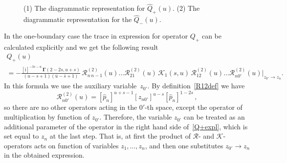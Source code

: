 \documentclass[a4paper,11pt]{article}
\renewcommand{\imath}{\mathrm{i}}
\numberwithin{equation}{section}
\begin{document}
\begin{figure}[H]
		\caption{
			(1) The diagrammatic representation for
			$\hat{Q}_+(u)$.
			(2) The diagrammatic representation for the 
			$\hat{Q}_-(u)$.}
		\label{q+-}	
	\end{figure}

In the one-boundary case the trace in expression for operator $Q_+$ can be calculated explicitly and we get the following result
\begin{multline} \label{Q+expl}
	Q_+(u) \\
	= -\frac{[\imath]^{-3s-u}\,\mathbf{\Gamma}(2-2s,u+s)}{(u-s+1)(\bar{u}-\bar{s}+1)} \,
	\mathcal{R}^{(2)}_{n\,n-1}(u)\ldots\mathcal{R}^{(2)}_{21}(u)\,\mathcal{K}_1(s,u)\,\mathcal{R}^{(2)}_{12}(u)\ldots\mathcal{R}^{(2)}_{n0'}(u)\Bigr|_{z_{0'}\to z_n} .
\end{multline}
In this formula we use the auxiliary variable~$z_{0'}$. By definition~\eqref{R12def} we have
$$
	\mathcal{R}^{(2)}_{n0'}(u) = [\hat{p}_n]^{u+s-1} [z_{n0'}]^{u-s} [\hat{p}_n]^{1-2s} \,,
$$
so there are no other operators acting in the $0'$-th space, except the operator of multiplication by function of $z_{0'}$.
Therefore, the variable $z_{0'}$ can be treated as an additional parameter of the operator in the right hand side of~\eqref{Q+expl},
which is set equal to $z_n$ at the last step.
That is, at first the product of $\mathcal{R}$- and $\mathcal{K}$-operators acts on function of variables $z_1,\dots, z_n$, and then one substitutes $z_{0'}\to z_n$ in the obtained expression.
\end{document}
